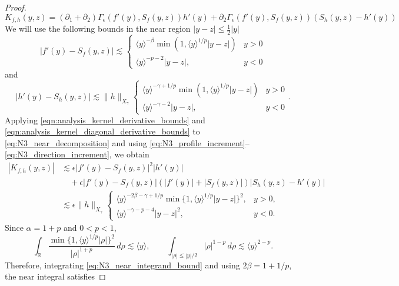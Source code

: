 \documentclass[11pt]{amsart}
\theoremstyle{definition}
\theoremstyle{remark}
\numberwithin{equation}{section}
\newcommand{\R}{\mathbb{R}}
\newcommand{\ang}[1]{\langle #1 \rangle}
\begin{document}
\begin{proof}
\begin{equation}\label{eq:N3_near_decomposition}K_{f,h}(y, z) = (\partial_1 + \partial_2) \Gamma_\epsilon(f'(y), S_f(y, z))h'(y) + \partial_2 \Gamma_\epsilon(f'(y), S_f(y, z))(S_h(y, z) - h'(y))\end{equation}
We will use the following bounds in the near region $|y - z| \leq \frac{1}{2} |y|$
\begin{equation}\label{eq:N3_profile_increment}|f'(y) - S_f(y, z)| \lesssim 
\begin{cases}
    \ang{y}^{-\beta}\min(1, \ang{y}^{1/p}|y - z|) & y > 0 \\
    \ang{y}^{-p - 2}|y-z|, & y < 0
\end{cases}  \end{equation}
and 
\begin{equation}\label{eq:N3_direction_increment}|h'(y) - S_h(y, z)| \lesssim \|h\|_{X_\gamma} 
\begin{cases}
    \ang{y}^{-\gamma+1/p}\min(1, \ang{y}^{1/p}|y - z|) & y > 0 \\
    \ang{y}^{-\gamma - 2}|y-z|, & y < 0
\end{cases}.\end{equation}
Applying \eqref{eqn:analysis_kernel_derivative_bounds} and \eqref{eqn:analysis_kernel_diagonal_derivative_bounds} to \eqref{eq:N3_near_decomposition} and using \eqref{eq:N3_profile_increment}--\eqref{eq:N3_direction_increment}, we obtain
\begin{equation}\label{eq:N3_near_integrand_bound}
\begin{aligned}
    |K_{f,h}(y, z)| & \lesssim \epsilon|f'(y) - S_f(y, z)|^2 |h'(y)| \\ &\quad + \epsilon|f'(y) - S_f(y, z)|(|f'(y)| + |S_f(y, z)|) |S_h(y, z) - h'(y)| \\
    & \lesssim \epsilon\|h\|_{X_\gamma}
    \begin{cases}
        \ang{y}^{-2\beta-\gamma+1/p}\min\{1,\ang{y}^{1/p}|y-z|\}^2, & y>0,\\
        \ang{y}^{-\gamma-p-4}|y-z|^2, & y<0.
    \end{cases}
\end{aligned}
\end{equation}
Since $\alpha=1+p$ and $0<p<1$,
\[
    \int_{\R}\frac{\min\{1,\ang{y}^{1/p}|\rho|\}^2}{|\rho|^{1+p}}\,d\rho
    \lesssim \ang{y},\qquad
    \int_{|\rho|\le |y|/2}|\rho|^{1-p}\,d\rho
    \lesssim\ang{y}^{2-p}.
\]
Therefore, integrating \eqref{eq:N3_near_integrand_bound} and using $2\beta=1+1/p$, the near integral satisfies

\end{proof}
\end{document}
